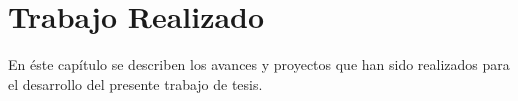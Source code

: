\chapter{Trabajo Realizado}
\label{TrabajoRealizado}


En éste capítulo se describen los avances y proyectos que han sido realizados para el desarrollo del presente trabajo de tesis.

%
%
%
